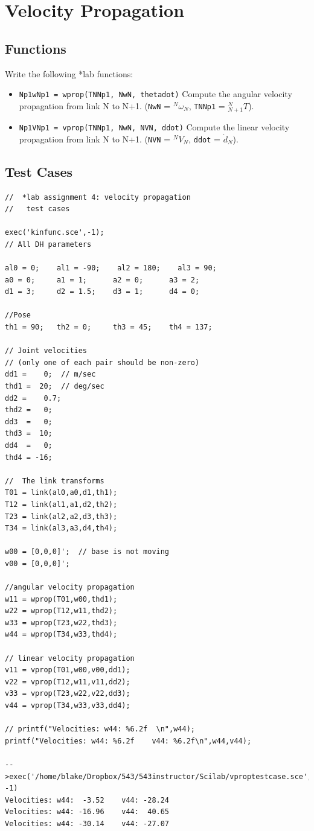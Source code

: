 \documentclass{article}
\begin{document}
\newpage
\section{Velocity Propagation}


\subsection{Functions}

Write the following *lab functions:

\begin{itemize}
  \item {\tt Np1wNp1 = wprop(TNNp1, NwN, thetadot)}		Compute the angular velocity propagation from link N to N+1. ({\tt NwN} = ${^N\omega_N}$, {\tt TNNp1} = ${^N_{N+1}T}$).
  \item {\tt Np1VNp1 = vprop(TNNp1, NwN, NVN, ddot)}		Compute the linear  velocity propagation from link N to N+1. ({\tt NVN} = ${^NV_N}$, {\tt ddot} = $\dot{d}_N$).
\end{itemize}




\subsection{Test Cases}

\begin{verbatim}
//  *lab assignment 4: velocity propagation
//   test cases

exec('kinfunc.sce',-1);
// All DH parameters

al0 = 0;    al1 = -90;    al2 = 180;    al3 = 90;
a0 = 0;     a1 = 1;      a2 = 0;      a3 = 2;
d1 = 3;     d2 = 1.5;    d3 = 1;      d4 = 0;

//Pose
th1 = 90;   th2 = 0;     th3 = 45;    th4 = 137;

// Joint velocities
// (only one of each pair should be non-zero)
dd1 =    0;  // m/sec
thd1 =  20;  // deg/sec
dd2 =    0.7;
thd2 =   0;
dd3  =   0;
thd3 =  10;
dd4  =   0;
thd4 = -16;

//  The link transforms
T01 = link(al0,a0,d1,th1);
T12 = link(al1,a1,d2,th2);
T23 = link(al2,a2,d3,th3);
T34 = link(al3,a3,d4,th4);

w00 = [0,0,0]';  // base is not moving
v00 = [0,0,0]';

//angular velocity propagation
w11 = wprop(T01,w00,thd1);
w22 = wprop(T12,w11,thd2);
w33 = wprop(T23,w22,thd3);
w44 = wprop(T34,w33,thd4);

// linear velocity propagation
v11 = vprop(T01,w00,v00,dd1);
v22 = vprop(T12,w11,v11,dd2);
v33 = vprop(T23,w22,v22,dd3);
v44 = vprop(T34,w33,v33,dd4);

// printf("Velocities: w44: %6.2f  \n",w44);
printf("Velocities: w44: %6.2f    v44: %6.2f\n",w44,v44);

-->exec('/home/blake/Dropbox/543/543instructor/Scilab/vproptestcase.sce', -1)
Velocities: w44:  -3.52    v44: -28.24
Velocities: w44: -16.96    v44:  40.65
Velocities: w44: -30.14    v44: -27.07
\end{verbatim}
\end{document}
